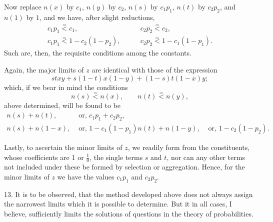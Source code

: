 \documentclass[oneside]{book}
\begin{document}
Now replace $n(x)$ by $c_1$, $n(y)$ by $c_2$, $n(s)$ by $c_1 p_1$, $n(t)$ by
$c_2 p_2$, and $n(1)$ by $1$, and we have, after slight reductions,
\[
\begin{array}{rl}
  c_1 p_1 \stackrel{=}{<} c_1, \qquad
& c_2 p_2 \stackrel{=}{<} c_2,\\
  c_1 p_1 \stackrel{=}{<} 1 - c_2(1-p_2), \qquad
& c_2 p_2 \stackrel{=}{<} 1 - c_1(1-p_1).
\end{array}
\]
Such are, then, the requisite conditions among the constants.

Again, the major limits of $z$ are identical with those of the
expression
\[
stxy + s(1-t) x(1-y) + (1-s)t(1-x)y;
\]
which, if we bear in mind the conditions
\[
n (s) \stackrel{=}{<} n (x), \qquad  n(t) \stackrel{=}{<} n (y),
\]
above determined, will be found to be
\begin{align*}
n(s) + n(t),   &\text{ or, } c_1p_1 + c_2p_2,\\
n(s) + n(1-x), &\text{ or, } 1-c_1 (1-p_1)
n(t) + n(1-y), &\text{ or, } 1-c_2 (1-p_2).
\end{align*}

Lastly, to ascertain the minor limits of $z$, we readily form
from the constituents, whose coefficients are 1 or $\frac{1}{0}$, the single
terms $s$ and $t$, nor can any other terms not included under these be
formed by selection or aggregation. Hence, for the minor limits
of $z$ we have the values $c_1p_1$ and $c_2p_2$.

13. It is to be observed, that the method developed above
does not always assign the narrowest limits which it is possible
to determine. But it in all cases, I believe, sufficiently limits the
solutions of questions in the theory of probabilities.
\end{document}

